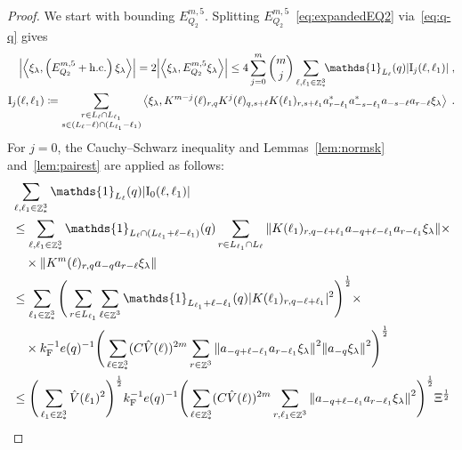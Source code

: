 \documentclass[12pt,a4paper]{article}
\numberwithin{equation}{section}
\newcommand{\1}{\mathbb{I}}
\newcommand{\F}{\mathrm{F}}
\newcommand{\I}{\mathrm{I}}
\DeclareMathOperator{\Z}{\mathbb{Z}}
\newcommand{\half}{\frac{1}{2}}
\newcommand{\eva}[1]{\left\langle #1 \right\rangle}
\theoremstyle{plain}
\theoremstyle{definition}
\theoremstyle{remark}
\theoremstyle{plain}
\theoremstyle{definition}
\theoremstyle{remark}
\begin{document}
\begin{proof}
We start with bounding $ E^{m,5}_{Q_2} $. Splitting $ E^{m,5}_{Q_2} $~\eqref{eq:expandedEQ2} via~\eqref{eq:q-q} gives
\begin{equation} \label{eq:EQ2131}
\begin{aligned}
	\abs{\eva{\xi_\lambda,\left(E^{m,5}_{Q_2}+\mathrm{h.c.}\right) \xi_\lambda }} 
	= 2\abs{\eva{\xi_\lambda, E^{m,5}_{Q_2} \xi_\lambda }}
	\le 4 \sum_{j=0}^m {{m}\choose j} \sum\limits_{\ell,\ell_1  \in \Z^3_*}\!\! \mathds{1}_{L_\ell}(q) |\I_j(\ell, \ell_1)| \;,\\
	\I_j(\ell, \ell_1)
	\coloneq \sum\limits_{\substack{r\in L_{\ell} \cap L_{\ell_1}\\ s \in (L_{\ell} - \ell) \cap (L_{\ell_1} - \ell_1)}}
		\eva{\xi_\lambda, K^{m-j}(\ell)_{r,q} K^{j}(\ell)_{q,s+\ell} K(\ell_1)_{r,s+\ell_1} a^*_{r-\ell_1} a^*_{-s-\ell_1} a_{-s-\ell} a_{r-\ell} \xi_\lambda} \;. \\
\end{aligned}
\end{equation}
For $ j = 0 $, the Cauchy--Schwarz inequality and Lemmas~\ref{lem:normsk} and~\ref{lem:pairest} are applied as follows:
\textcolor{green!30!black}{
\begin{align}
	&\sum_{\ell,\ell_1 \in \Z^3_*} \mathds{1}_{L_\ell}(q) |\I_0(\ell, \ell_1)| \nonumber\\
	&\leq \sum_{\ell,\ell_1 \in \Z^3_*} \mathds{1}_{L_\ell \cap (L_{\ell_1}+\ell-\ell_1)}(q) \sum\limits_{r\in L_{\ell_1} \cap L_\ell}
		\norm{ K(\ell_1)_{r,q-\ell+\ell_1} a_{-q+\ell-\ell_1} a_{r-\ell_1} \xi_\lambda} \times \nonumber\\
	&\quad \times \norm{ K^m(\ell)_{r,q} a_{-q}a_{r-\ell} \xi_\lambda } \nonumber\\
	&\leq \sum_{\ell_1 \in \Z^3_*}
		\Bigg( \sum_{r\in L_{\ell_1}} \sum_{\ell \in \Z^3} \mathds{1}_{L_{\ell_1}+\ell-\ell_1}(q) |K(\ell_1)_{r,q-\ell+\ell_1}|^2 \Bigg)^{\half} \times \nonumber\\
	&\quad \times k_{\F}^{-1} e(q)^{-1} \Bigg( \sum_{\ell \in \Z^3_*} (C \hat{V}(\ell))^{2m} \sum_{r\in \Z^3} \norm{a_{-q+\ell-\ell_1} a_{r-\ell_1} \xi_\lambda}^2
		\norm{ a_{-q} \xi_\lambda }^2 \Bigg)^{\half} \nonumber\\
	&\leq \Bigg( \sum_{\ell_1 \in \Z^3_*} \hat{V}(\ell_1)^2 \Bigg)^{\half} k_{\F}^{-1} e(q)^{-1}
		\Bigg( \sum_{\ell \in \Z^3_*} (C \hat{V}(\ell))^{2m} \sum_{r,\ell_1 \in \Z^3} \norm{a_{-q+\ell-\ell_1} a_{r-\ell_1} \xi_\lambda}^2 \Bigg)^{\half} \Xi^{\half} \nonumber\\

\end{align}}
\end{proof}
\end{document}
